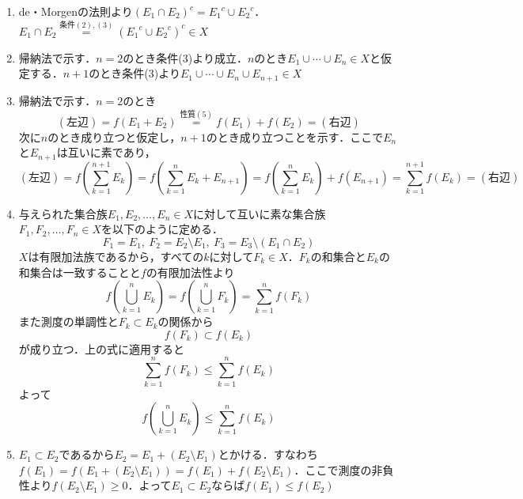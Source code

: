 \documentclass[dvipdfmx, leqno]{jsreport}
\begin{document}
\begin{souanswer}
\begin{enumerate}
    \item de・Morgenの法則より${(E_1\cap E_2)}^c= {E_1}^c\cup {E_2}^c$．
    $E_1\cap E_2\stackrel{条件(2), (3)}{=} ({E_1}^c\cup {E_2}^c)^c\in X$

    \item 帰納法で示す．$n= 2$のとき条件(3)より成立．$n$のとき$E_1\cup \cdots\cup E_n\in X$と仮定する．$n+ 1$のとき条件(3)より$E_1\cup \cdots\cup E_n\cup E_{n+1}\in X$
    
    \item 帰納法で示す．$n= 2$のとき
\begin{equation*}
    (左辺)= f(E_1+ E_2)\stackrel{性質(5)}{=} f(E_1)+ f(E_2)= (右辺)
\end{equation*}
    次に$n$のとき成り立つと仮定し，$n+ 1$のとき成り立つことを示す．ここで$E_n$と$E_{n+ 1}$は互いに素であり，
\begin{equation*}
    (左辺)= f\left(\sum_{k= 1}^{n+ 1}E_k\right)= f\left(\sum_{k= 1}^n E_k+ E_{n+ 1}\right)= f\left(\sum_{k= 1}^n E_k\right)+ f(E_{n+ 1})= \sum_{k= 1}^{n+ 1} f(E_k)= (右辺)
\end{equation*}

    \item 与えられた集合族$E_1, E_2, \ldots, E_n\in X$に対して互いに素な集合族$F_1, F_2, \ldots, F_n\in X$を以下のように定める．
\begin{equation}
    F_1= E_1,\ F_2= E_2\setminus E_1,\ F_3= E_3\setminus (E_1\cap E_2)
\end{equation}
    $X$は有限加法族であるから，すべての$k$に対して$F_k\in X$．$F_k$の和集合と$E_k$の
    和集合は一致することと$f$の有限加法性より
\begin{equation}
    f\left(\bigcup_{k= 1}^n E_k\right)= f\left(\bigcup_{k= 1}^n F_k\right)= \sum_{k= 1}^n f(F_k)
\end{equation}
    また測度の単調性と$F_k\subset E_k$の関係から
\begin{equation}
    f(F_k)\subset f(E_k)
\end{equation}
    が成り立つ．上の式に適用すると
\begin{equation}
    \sum_{k= 1}^n f(F_k)\le \sum_{k= 1}^n f(E_k)
\end{equation}
    よって
\begin{equation}
    f\left(\bigcup_{k= 1}^n E_k\right)\le \sum_{k= 1}^n f(E_k)
\end{equation}

\item $E_1\subset E_2$であるから$E_2= E_1+ (E_2\setminus E_1)$とかける．すなわち$f(E_1)= f(E_1+ (E_2\setminus E_1))= f(E_1)+ f(E_2\setminus E_1)$．ここで測度の非負性より$f(E_2\setminus E_1)\ge 0$．よって$E_1\subset E_2$ならば$f(E_1)\le f(E_2)$
\end{enumerate}
\end{souanswer}
\end{document}
